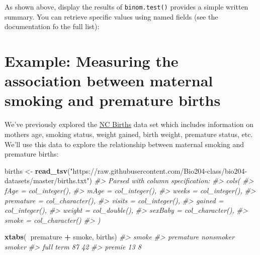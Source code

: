 \documentclass[]{book}
\newenvironment{Shaded}{\begin{snugshade}}{\end{snugshade}}
\newcommand{\CommentTok}[1]{\textcolor[rgb]{0.56,0.35,0.01}{\textit{#1}}}
\newcommand{\KeywordTok}[1]{\textcolor[rgb]{0.13,0.29,0.53}{\textbf{#1}}}
\newcommand{\NormalTok}[1]{#1}
\newcommand{\OperatorTok}[1]{\textcolor[rgb]{0.81,0.36,0.00}{\textbf{#1}}}
\newcommand{\StringTok}[1]{\textcolor[rgb]{0.31,0.60,0.02}{#1}}
\theoremstyle{definition}
\theoremstyle{definition}
\theoremstyle{definition}
\theoremstyle{remark}
\begin{document}
As shown above, display the results of \texttt{binom.test()} provides a
simple written summary. You can retrieve specific values using named
fields (see the documentation fo the full list):

\begin{Shaded}
\end{Shaded}

\hypertarget{example-measuring-the-association-between-maternal-smoking-and-premature-births}{%
\section{Example: Measuring the association between maternal smoking and
premature
births}\label{example-measuring-the-association-between-maternal-smoking-and-premature-births}}

We've previously explored the
\href{https://raw.githubusercontent.com/Bio204-class/bio204-datasets/master/births.txt}{NC
Births} data set which includes information on mothers age, smoking
status, weight gained, birth weight, premature status, etc. We'll use
this data to explore the relationship between maternal smoking and
premature births:

\begin{Shaded}
\begin{Highlighting}[]
\NormalTok{births <-}\StringTok{ }\KeywordTok{read_tsv}\NormalTok{(}\StringTok{"https://raw.githubusercontent.com/Bio204-class/bio204-datasets/master/births.txt"}\NormalTok{)}
\CommentTok{#> Parsed with column specification:}
\CommentTok{#> cols(}
\CommentTok{#>   fAge = col_integer(),}
\CommentTok{#>   mAge = col_integer(),}
\CommentTok{#>   weeks = col_integer(),}
\CommentTok{#>   premature = col_character(),}
\CommentTok{#>   visits = col_integer(),}
\CommentTok{#>   gained = col_integer(),}
\CommentTok{#>   weight = col_double(),}
\CommentTok{#>   sexBaby = col_character(),}
\CommentTok{#>   smoke = col_character()}
\CommentTok{#> )}

\KeywordTok{xtabs}\NormalTok{(}\OperatorTok{~}\NormalTok{premature }\OperatorTok{+}\StringTok{ }\NormalTok{smoke, births)}
\CommentTok{#>            smoke}
\CommentTok{#> premature   nonsmoker smoker}
\CommentTok{#>   full term        87     42}
\CommentTok{#>   premie           13      8}
\end{Highlighting}
\end{Shaded}
\end{document}
